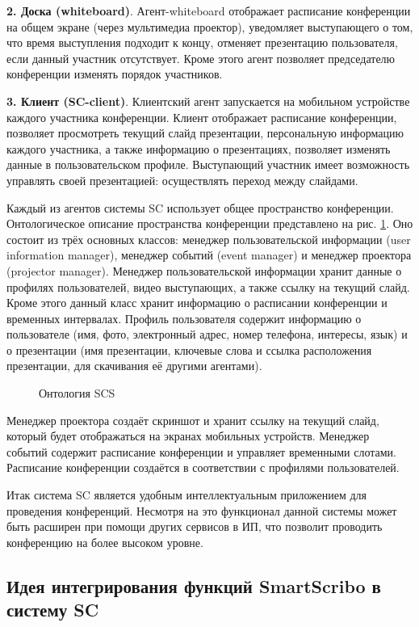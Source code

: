{\bf 2. Доска (whiteboard)}.
Агент-whiteboard отображает расписание конференции на общем экране (через мультимедиа проектор), уведомляет выступающего о том, что время выступления подходит к концу, отменяет презентацию пользователя, если данный участник отсутствует. Кроме этого агент позволяет председателю конференции изменять порядок участников.

{\bf 3. Клиент (SC-client)}.
Клиентский агент запускается на мобильном устройстве каждого участника конференции. Клиент отображает расписание конференции, позволяет просмотреть текущий слайд презентации, персональную информацию каждого участника, а также информацию о презентациях, позволяет изменять данные в пользовательском профиле. Выступающий участник имеет возможность управлять своей презентацией: осуществлять переход между слайдами.

Каждый из агентов системы SC использует общее пространство конференции. Онтологическое описание пространства конференции представлено на рис. \ref{scs-ontology}. Оно состоит из трёх основных классов: менеджер пользовательской информации (user information manager), менеджер событий (event manager) и менеджер проектора (projector manager). Менеджер пользовательской информации хранит данные о профилях пользователей, видео выступающих, а также ссылку на текущий слайд. Кроме этого данный класс хранит информацию о расписании конференции и временных интервалах. Профиль пользователя содержит информацию о пользователе (имя, фото, электронный адрес, номер телефона, интересы, язык) и о презентации (имя презентации, ключевые слова и ссылка расположения презентации, для скачивания её другими агентами).
\begin{figure}[h]
\centerline{
}
\caption{Онтология SCS}
\label{scs-ontology}
\end{figure}

Менеджер проектора создаёт скриншот и хранит ссылку на текущий слайд, который будет отображаться на экранах мобильных устройств. Менеджер событий содержит расписание конференции и управляет временными слотами. Расписание конференции создаётся в соответствии с профилями пользователей.

Итак система SC является удобным интеллектуальным приложением для проведения конференций. Несмотря на это функционал данной системы может быть расширен при помощи других сервисов в ИП, что позволит проводить конференцию на более высоком уровне.

\subsection*{Идея интегрирования функций SmartScribo в систему SC}

